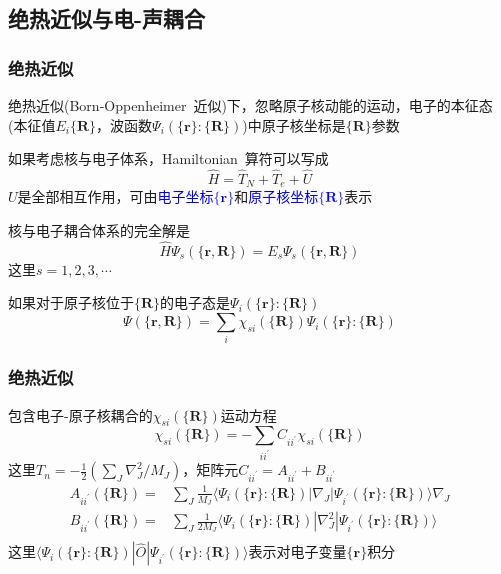 \documentclass[cjk,slidestop,compress,mathserif,blue]{beamer}
\begin{document}
\subsection{绝热近似与电-声耦合}
\frame
{
	\frametitle{绝热近似}
	绝热近似(\textrm{Born-Oppenheimer~}近似)下，忽略原子核动能的运动，电子的本征态(本征值$E_i\{\mathbf{R}\}$，波函数$\Psi_i(\{\mathbf{r}\}:\{\mathbf{R}\})$)中原子核坐标是$\{\mathbf{R}\}$参数

	如果考虑核与电子体系，\textrm{Hamiltonian~}算符可以写成
	\begin{displaymath}
		\hat H=\hat T_N+\hat T_e+\hat U
	\end{displaymath}
	$U$是全部相互作用，可由\textcolor{blue}{电子坐标$\{\mathbf{r}\}$}和\textcolor{blue}{原子核坐标$\{\mathbf{R}\}$}表示

	核与电子耦合体系的完全解是
	\begin{displaymath}
		\hat H\Psi_s(\{\mathbf{r},\mathbf{R}\})=E_s\Psi_s(\{\mathbf{r},\mathbf{R}\})
	\end{displaymath}
	这里$s=1,2,3,\cdots$

	如果对于原子核位于$\{\mathbf{R}\}$的电子态是$\Psi_i(\{\mathbf{r}\}:\{\mathbf{R}\})$
	\begin{displaymath}
		\Psi(\{\mathbf{r},\mathbf{R}\})=\sum_i\chi_{si}(\{\mathbf{R}\})\Psi_i(\{\mathbf{r}\}:\{\mathbf{R}\})
	\end{displaymath}
}

\frame
{
	\frametitle{绝热近似}
	包含电子-原子核耦合的$\chi_{si}(\{\mathbf{R}\})$运动方程
	\begin{displaymath}
		[T_N+E_i(\{\mathbf{R}\})-E_s]\chi_{si}(\{\mathbf{R}\})=-\sum_{ii^{\prime}}C_{ii^{\prime}}\chi_{si}(\{\mathbf{R}\})
	\end{displaymath}
	这里$T_n=-\frac12(\sum\limits_J\nabla_J^2/M_J)$，矩阵元$C_{ii^{\prime}}=A_{ii^{\prime}}+B_{ii^{\prime}}$
	\begin{displaymath}
		\begin{aligned}
			A_{ii^{\prime}}(\{\mathbf{R}\})=&\sum_J\frac1{M_J}\langle\Psi_i(\{\mathbf{r}\}:\{\mathbf{R}\})|\nabla_J|\Psi_{i^{\prime}}(\{\mathbf{r}\}:\{\mathbf{R}\})\rangle\nabla_J\\
			B_{ii^{\prime}}(\{\mathbf{R}\})=&\sum_J\frac1{2M_J}\langle\Psi_i(\{\mathbf{r}\}:\{\mathbf{R}\})|\nabla_J^2|\Psi_{i^{\prime}}(\{\mathbf{r}\}:\{\mathbf{R}\})\rangle\\
		\end{aligned}
	\end{displaymath}
	这里$\langle\Psi_i(\{\mathbf{r}\}:\{\mathbf{R}\})|\hat O|\Psi_{i^{\prime}}(\{\mathbf{r}\}:\{\mathbf{R}\})\rangle$表示对电子变量$\{\mathbf{r}\}$积分
}
\end{document}
